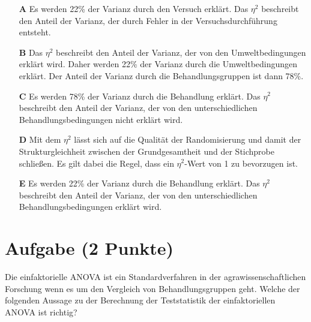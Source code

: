 \documentclass[a4paper, 9pt]{scrartcl}\usepackage[]{graphicx}\usepackage[]{xcolor}
\begin{document}
\begin{enumerate}
\item [\textbf{A} \msquare] Es werden 22\% der Varianz durch den Versuch erklärt. Das $\eta^2$ beschreibt den Anteil der Varianz, der durch Fehler in der Versuchsdurchführung entsteht.
\item [\textbf{B} \msquare] Das $\eta^2$ beschreibt den Anteil der Varianz, der von den Umweltbedingungen erklärt wird. Daher werden 22\% der Varianz durch die Umweltbedingungen erklärt. Der Anteil der Varianz durch die Behandlungsgruppen ist dann 78\%.
\item [\textbf{C} \msquare] Es werden 78\% der Varianz durch die Behandlung erklärt. Das $\eta^2$ beschreibt den Anteil der Varianz, der von den unterschiedlichen Behandlungsbedingungen nicht erklärt wird.
\item [\textbf{D} \msquare] Mit dem $\eta^2$ lässt sich auf die Qualität der Randomisierung und damit der Strukturgleichheit zwischen der Grundgesamtheit und der Stichprobe schließen. Es gilt dabei die Regel, dass ein $\eta^2$-Wert von 1 zu bevorzugen ist.
\item [\textbf{E} \msquare] Es werden 22\% der Varianz durch die Behandlung erklärt. Das $\eta^2$ beschreibt den Anteil der Varianz, der von den unterschiedlichen Behandlungsbedingungen erklärt wird.
\end{enumerate} 

\section{Aufgabe \hfill (2 Punkte)}



Die einfaktorielle ANOVA ist ein Standardverfahren in der agrawissenschaftlichen Forschung wenn es um den Vergleich von Behandlungsgruppen geht. Welche der folgenden Aussage zu der Berechnung der Teststatistik der einfaktoriellen ANOVA ist richtig?
\end{document}
